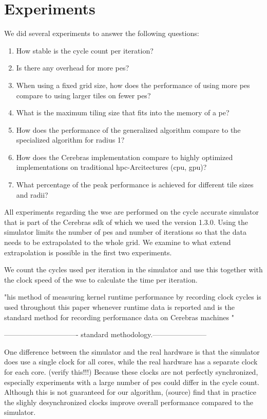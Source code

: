 \chapter{Experiments}
\label{sec:experiments}
We did several experiments to answer the following questions:
\begin{enumerate}
    \item How stable is the cycle count per iteration?
    \item Is there any overhead for more \acp{pe}?
    \item When using a fixed grid size, how does the performance of using more \acp{pe} compare to using larger tiles on fewer \acp{pe}?
    \item What is the maximum tiling size that fits into the memory of a \ac{pe}?
    \item How does the performance of the generalized algorithm compare to the specialized algorithm for radius 1?
    \item How does the Cerebras implementation compare to highly optimized implementations on traditional \ac{hpc}-Arcitectures (\ac{cpu}, \ac{gpu})?
    \item What percentage of the peak performance is achieved for different tile sizes and radii?
\end{enumerate}

All experiments regarding the \ac{wse} are performed on the cycle accurate simulator that is part of the Cerebras \ac{sdk} of which we used the version 1.3.0.
Using the simulator limits the number of \acp{pe} and number of iterations so that the data needs to be extrapolated to the whole grid.
We examine to what extend extrapolation is possible in the first two experiments.

We count the cycles used per iteration in the simulator and use this together with the clock speed of the \ac{wse} to calculate the time per iteration.


"his method of measuring kernel runtime performance by recording clock
cycles is used throughout this paper whenever runtime data is reported and is the
standard method for recording performance data on Cerebras machines "

------------------------------- standard methodology.-----------------------

One difference between the simulator and the real hardware is that the simulator does use a single clock for all cores, while the real hardware has a separate clock for each core. (verify this!!!) Because these clocks are not perfectly synchronized, especially experiments with a large number of \acp{pe} could differ in the cycle count. Although this is not guaranteed for our algorithm, (source) find that in practice the slighly desynchronized clocks improve overall performance compared to the simulator. 

